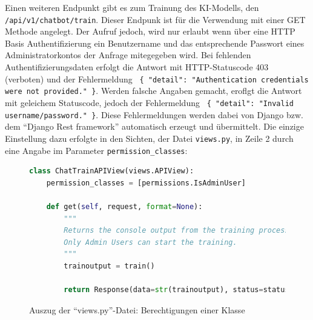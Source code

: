 \documentclass[12pt,oneside,titlepage,listof=totoc,bibliography=totoc]{scrartcl}
\newcommand{\code}[1]{\colorbox{code-gray}{\texttt{#1}}}
\begin{document}
Einen weiteren Endpunkt gibt es zum Trainung des KI-Modells, den \code{/api/v1/chatbot/train}. Dieser Endpunk ist für die Verwendung mit einer GET Methode angelegt. Der Aufruf jedoch, wird nur erlaubt wenn über eine HTTP Basis Authentifizierung ein Benutzername und das entsprechende Passwort eines Administratorkontos der Anfrage mitegegeben wird. Bei fehlenden Authentifizierungsdaten erfolgt die Antwort mit HTTP-Statuscode 403 (verboten) und der Fehlermeldung \code{ \{ "detail": "Authentication credentials were not provided." \}}. Werden falsche Angaben gemacht, eroflgt die Antwort mit geleichem Statuscode, jedoch der Fehlermeldung \code{ \{ "detail": "Invalid username/password." \}}. Diese Fehlermeldungen werden dabei von Django bzw. dem \enquote{Django Rest framework} automatisch erzeugt und übermittelt. Die einzige Einstellung dazu erfolgte in den Sichten, der Datei \code{views.py}, in Zeile 2 durch eine Angabe im Parameter \code{permission_classes}:

\begin{figure}[H]
	\caption{Auszug der \enquote{views.py}-Datei: Berechtigungen einer Klasse}
	\label{fig:code-django-views-admin-only}
\begin{lstlisting}[language=python]
class ChatTrainAPIView(views.APIView):
    permission_classes = [permissions.IsAdminUser]

    def get(self, request, format=None):
        """
        Returns the console output from the training process.
        Only Admin Users can start the training.
        """
        trainoutput = train()
        
        return Response(data=str(trainoutput), status=status.HTTP_200_OK)
\end{lstlisting}
\end{figure}




\end{document}

